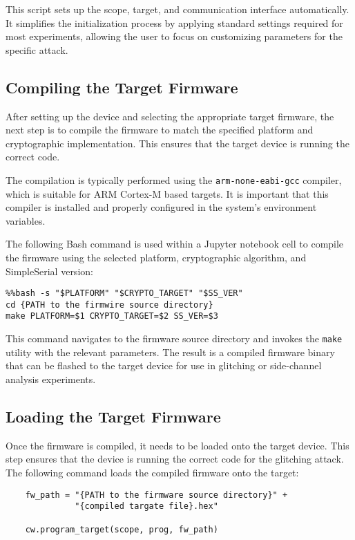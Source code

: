 This script sets up the scope, target, and communication interface automatically. It simplifies the initialization process by applying standard settings required for most experiments, allowing the user to focus on customizing parameters for the specific attack.
\subsection{Compiling the Target Firmware}

After setting up the device and selecting the appropriate target firmware, the next step is to compile the firmware to match the specified platform and cryptographic implementation. This ensures that the target device is running the correct code.

The compilation is typically performed using the \texttt{arm-none-eabi-gcc} compiler, which is suitable for ARM Cortex-M based targets. It is important that this compiler is installed and properly configured in the system's environment variables.

The following Bash command is used within a Jupyter notebook cell to compile the firmware using the selected platform, cryptographic algorithm, and SimpleSerial version:

\begin{verbatim}
%%bash -s "$PLATFORM" "$CRYPTO_TARGET" "$SS_VER"
cd {PATH to the firmwire source directory}
make PLATFORM=$1 CRYPTO_TARGET=$2 SS_VER=$3
\end{verbatim}

This command navigates to the firmware source directory and invokes the \texttt{make} utility with the relevant parameters. The result is a compiled firmware binary that can be flashed to the target device for use in glitching or side-channel analysis experiments.

\subsection{Loading the Target Firmware}
Once the firmware is compiled, it needs to be loaded onto the target device. This step ensures that the device is running the correct code for the glitching attack.
The following command loads the compiled firmware onto the target:
\begin{verbatim}
    fw_path = "{PATH to the firmware source directory}" + 
              "{compiled targate file}.hex"
    
    cw.program_target(scope, prog, fw_path)
    \end{verbatim}

